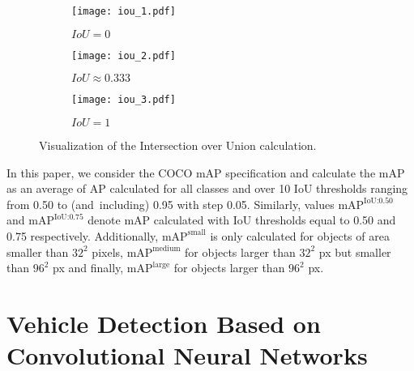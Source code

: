 \begin{figure}[h]
    \centering
    \begin{subfigure}[b]{0.3125\textwidth}
        \texttt{[image: iou\_1.pdf]}
        \caption{$IoU = 0$}
    \end{subfigure}
    \hfill
    \begin{subfigure}[b]{0.2272727\textwidth}
        \texttt{[image: iou\_2.pdf]}
        \caption{$IoU \approx 0.333$}
    \end{subfigure}
    \hfill
    \begin{subfigure}[b]{0.15151515\textwidth}
        \texttt{[image: iou\_3.pdf]}
        \caption{$IoU = 1$}
    \end{subfigure}

    \caption{Visualization of the Intersection over Union calculation.}
    \label{IoU}
\end{figure}

In this paper, we consider the COCO mAP specification and calculate the mAP as
an average of AP calculated for all classes and over 10 IoU thresholds ranging
from \num{0.50} to (and~including) \num{0.95} with step \num{0.05}. Similarly,
values $\text{mAP}^{\text{IoU:0.50}}$ and $\text{mAP}^{\text{IoU:0.75}}$ denote
mAP calculated with IoU thresholds equal to \num{0.50} and \num{0.75}
respectively. Additionally, $\text{mAP}^{\text{small}}$ is only calculated for
objects of area smaller than $32^2$ pixels, $\text{mAP}^{\text{medium}}$ for
objects larger than $32^2$ px but smaller than $96^2$ px and finally,
$\text{mAP}^{\text{large}}$ for objects larger than $96^2$ px.




\section{Vehicle Detection Based on Convolutional Neural Networks}


